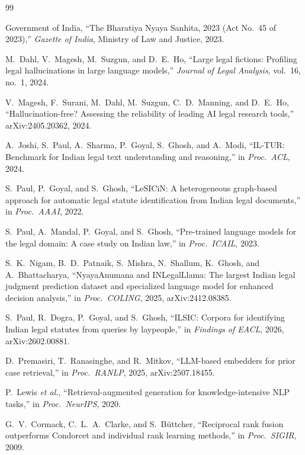 \documentclass[conference]{IEEEtran}
\begin{document}
\begin{thebibliography}{99}

 Government of India, ``The Bharatiya Nyaya Sanhita, 2023 (Act No.\ 45 of 2023),'' \emph{Gazette of India}, Ministry of Law and Justice, 2023.

 M.~Dahl, V.~Magesh, M.~Suzgun, and D.~E.~Ho, ``Large legal fictions: Profiling legal hallucinations in large language models,'' \emph{Journal of Legal Analysis}, vol.~16, no.~1, 2024.

 V.~Magesh, F.~Surani, M.~Dahl, M.~Suzgun, C.~D.~Manning, and D.~E.~Ho, ``Hallucination-free? Assessing the reliability of leading AI legal research tools,'' arXiv:2405.20362, 2024.

 A.~Joshi, S.~Paul, A.~Sharma, P.~Goyal, S.~Ghosh, and A.~Modi, ``IL-TUR: Benchmark for Indian legal text understanding and reasoning,'' in \emph{Proc.\ ACL}, 2024.

 S.~Paul, P.~Goyal, and S.~Ghosh, ``LeSICiN: A heterogeneous graph-based approach for automatic legal statute identification from Indian legal documents,'' in \emph{Proc.\ AAAI}, 2022.

 S.~Paul, A.~Mandal, P.~Goyal, and S.~Ghosh, ``Pre-trained language models for the legal domain: A case study on Indian law,'' in \emph{Proc.\ ICAIL}, 2023.

 S.~K.~Nigam, B.~D.~Patnaik, S.~Mishra, N.~Shallum, K.~Ghosh, and A.~Bhattacharya, ``NyayaAnumana and INLegalLlama: The largest Indian legal judgment prediction dataset and specialized language model for enhanced decision analysis,'' in \emph{Proc.\ COLING}, 2025, arXiv:2412.08385.

 S.~Paul, R.~Dogra, P.~Goyal, and S.~Ghosh, ``ILSIC: Corpora for identifying Indian legal statutes from queries by laypeople,'' in \emph{Findings of EACL}, 2026, arXiv:2602.00881.

 D.~Premasiri, T.~Ranasinghe, and R.~Mitkov, ``LLM-based embedders for prior case retrieval,'' in \emph{Proc.\ RANLP}, 2025, arXiv:2507.18455.

 P.~Lewis \emph{et al.}, ``Retrieval-augmented generation for knowledge-intensive NLP tasks,'' in \emph{Proc.\ NeurIPS}, 2020.

 G.~V.~Cormack, C.~L.~A.~Clarke, and S.~B{\"u}ttcher, ``Reciprocal rank fusion outperforms Condorcet and individual rank learning methods,'' in \emph{Proc.\ SIGIR}, 2009.


\end{thebibliography}
\end{document}
